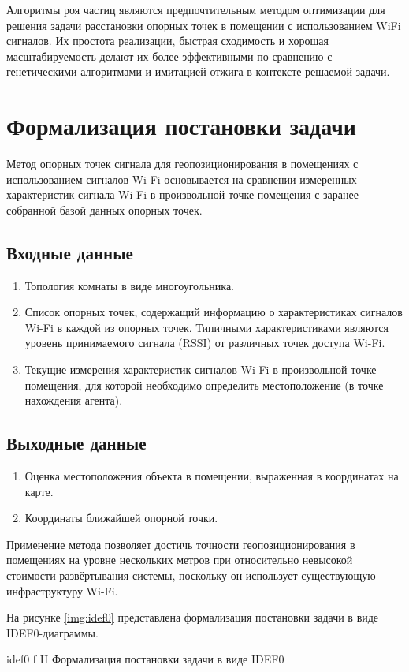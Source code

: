 Алгоритмы роя частиц являются предпочтительным методом оптимизации для решения задачи расстановки опорных точек в помещении с использованием WiFi сигналов. Их простота реализации, быстрая сходимость и хорошая масштабируемость делают их более эффективными по сравнению с генетическими алгоритмами и имитацией отжига в контексте решаемой задачи.

\section{Формализация постановки задачи}

Метод опорных точек сигнала для геопозиционирования в помещениях с использованием сигналов Wi-Fi основывается на сравнении измеренных характеристик сигнала Wi-Fi в произвольной точке помещения с заранее собранной базой данных опорных точек.

\subsection*{Входные данные}

\begin{enumerate}
    \item Топология комнаты в виде многоугольника.
    \item Список опорных точек, содержащий информацию о характеристиках сигналов Wi-Fi в каждой из опорных точек. Типичными характеристиками являются уровень принимаемого сигнала (RSSI) от различных точек доступа Wi-Fi.
    \item Текущие измерения характеристик сигналов Wi-Fi в произвольной точке помещения, для которой необходимо определить местоположение (в точке нахождения агента).
\end{enumerate}

\subsection*{Выходные данные}

\begin{enumerate}
    \item Оценка местоположения объекта в помещении, выраженная в координатах на карте.
    \item Координаты ближайшей опорной точки.
\end{enumerate}

Применение метода позволяет достичь точности геопозиционирования в помещениях на уровне нескольких метров при относительно невысокой стоимости развёртывания системы, поскольку он использует существующую инфраструктуру Wi-Fi.

\clearpage

На рисунке \ref{img:idef0} представлена формализация постановки задачи в виде IDEF0-диаграммы.

    {idef0}
    {f}
    {H}
    {\linewidth}
    {Формализация постановки задачи в виде IDEF0}
